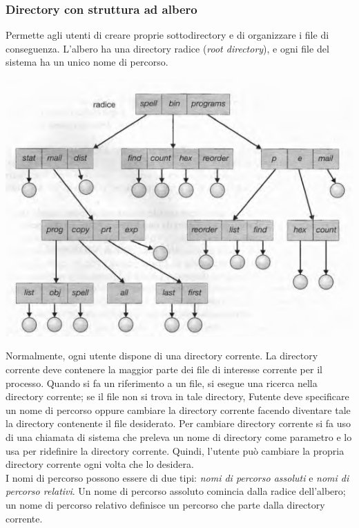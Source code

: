 \documentclass[11pt,a4paper]{article}
\begin{document}
{\subsubsection{Directory con struttura ad albero}
Permette agli utenti di creare pro­prie sottodirectory e di organizzare i file di conseguenza. L'albero ha una directory radice (\emph{root directory}), e ogni file del sistema ha un unico nome di percorso.
\begin{center}
  \includegraphics[scale=0.6]{img/0062.png}
\end{center}
Normalmente, ogni utente dispone di una directory corrente. La directory corrente
deve contenere la maggior parte dei file di interesse corrente per il processo. Quando si fa un
riferimento a un file, si esegue una ricerca nella directory corrente; se il file non si trova in
tale directory, Futente deve specificare un nome di percorso oppure cambiare la directory
corrente facendo diventare tale la directory contenente il file desiderato. Per cambiare direc­tory corrente si fa uso di una chiamata di sistema che preleva un nome di directory come pa­rametro e lo usa per ridefinire la directory corrente. Quindi, l'utente può cambiare la pro­pria directory corrente ogni volta che lo desidera.\medskip\\
I nomi di percorso possono essere di due tipi: \emph{nomi di percorso assoluti} e \emph{nomi di
percorso relativi}. Un nome di percorso assoluto comincia dalla radice dell'albero; un nome di percorso relativo definisce un percorso che parte dalla directory corrente.

}
\end{document}
